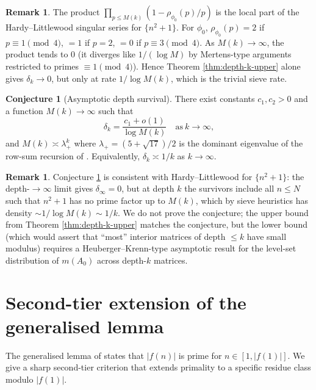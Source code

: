 \documentclass[11pt]{article}
\theoremstyle{definition}
\newtheorem{remark}[theorem]{Remark}
\newtheorem{conjecture}[theorem]{Conjecture}
\begin{document}
\begin{remark}\label{rem:singular-series-evaluation}
The product $\prod_{p \le M(k)} (1 - \rho_{\phi_0}(p)/p)$ is the local part of the Hardy--Littlewood singular series for $\{n^2+1\}$. For $\phi_0$, $\rho_{\phi_0}(p) = 2$ if $p \equiv 1 \pmod 4$, $=1$ if $p = 2$, $=0$ if $p \equiv 3 \pmod 4$. As $M(k) \to \infty$, the product tends to $0$ (it diverges like $1/(\log M)$ by Mertens-type arguments restricted to primes $\equiv 1 \pmod 4$). Hence Theorem \ref{thm:depth-k-upper} alone gives $\delta_k \to 0$, but only at rate $1/\log M(k)$, which is the trivial sieve rate.
\end{remark}

\begin{conjecture}[Asymptotic depth survival]\label{conj:depth-asymp}
There exist constants $c_1, c_2 > 0$ and a function $M(k) \to \infty$ such that
\[
\delta_k = \frac{c_1 + o(1)}{\log M(k)} \quad \text{as}\ k \to \infty,
\]
and $M(k) \asymp \lambda_+^k$ where $\lambda_+ = (5+\sqrt{17})/2$ is the dominant eigenvalue of the row-sum recursion of \cite[Cor.~ closed\_forms]{shakov}. Equivalently, $\delta_k \asymp 1/k$ as $k \to \infty$.
\end{conjecture}

\begin{remark}
Conjecture \ref{conj:depth-asymp} is consistent with Hardy--Littlewood for $\{n^2+1\}$: the depth-$\to \infty$ limit gives $\delta_\infty = 0$, but at depth $k$ the survivors include all $n \le N$ such that $n^2+1$ has no prime factor up to $M(k)$, which by sieve heuristics has density $\sim 1/\log M(k) \sim 1/k$. We do not prove the conjecture; the upper bound from Theorem \ref{thm:depth-k-upper} matches the conjecture, but the lower bound (which would assert that ``most'' interior matrices of depth $\le k$ have small modulus) requires a Heuberger--Krenn-type asymptotic result for the level-set distribution of $m(A_0)$ across depth-$k$ matrices.
\end{remark}

\section{Second-tier extension of the generalised lemma}\label{sec:second-tier}

The generalised lemma of \cite[Theorem 1.3]{B8} states that $|f(n)|$ is prime for $n \in [1, |f(1)|]$. We give a sharp second-tier criterion that extends primality to a specific residue class modulo $|f(1)|$.
\end{document}
